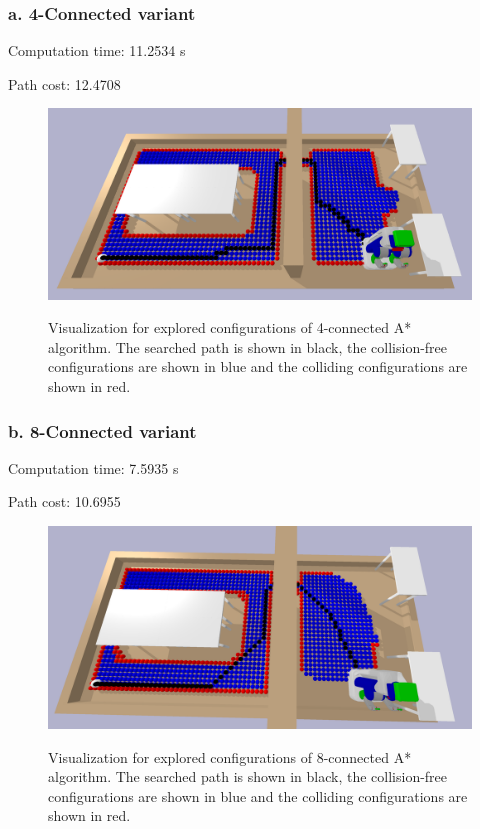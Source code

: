 \documentclass{article}
\theoremstyle{definition} %
\begin{document}
\subsubsection*{a. 4-Connected variant}
Computation time: 11.2534 s

Path cost: 12.4708

\begin{figure}[H]
    \centering
        \textsf{\includegraphics[width=0.8\columnwidth]{astar_4.png}}
        \caption{Visualization for explored configurations of 4-connected A* algorithm. The searched path is shown in black, the collision-free configurations are shown in blue and the colliding configurations are shown in red.}
        \label{fig:astar_4}
\end{figure}

\subsubsection*{b. 8-Connected variant}
Computation time: 7.5935 s

Path cost: 10.6955

\begin{figure}[H]
    \centering
        \textsf{\includegraphics[width=0.8\columnwidth]{astar_8.png}}
        \caption{Visualization for explored configurations of 8-connected A* algorithm. The searched path is shown in black, the collision-free configurations are shown in blue and the colliding configurations are shown in red.}
        \label{fig:astar_8}
\end{figure}
\end{document}
